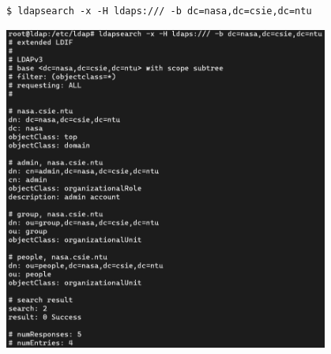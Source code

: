 \documentclass[12pt, a4paper]{article}
\begin{document}
\begin{enumerate}[label=(\alph*)]
    \begin{Verbatim}[frame=single]
$ ldapsearch -x -H ldaps:/// -b dc=nasa,dc=csie,dc=ntu
    \end{Verbatim}

    \includegraphics[width=0.8\textwidth]{1-b_ldapsearch_ldaps.png}
  \end{enumerate}
\end{document}
